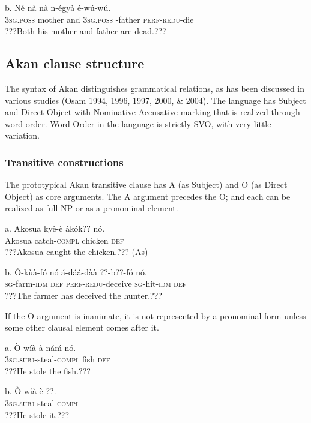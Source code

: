 \documentclass[output=paper]{langsci/langscibook}
\begin{document}
\ea
\gll  b.  Né    nà    nà  n-égyà      é-wú-wú.\\
       \textsc{3sg.poss}  mother    and  \textsc{3sg.poss} -father  \textsc{perf-redu}{}-die\\
\glt   ???Both his mother and father are dead.??? \citep[24]{Martin1936}
\z

\subsection{Akan clause structure}

The syntax of Akan distinguishes grammatical relations, as has been discussed in various studies (Osam 1994, 1996, 1997, 2000, \& 2004). The language has Subject and Direct Object with Nominative Accusative marking that is realized through word order. Word Order in the language is strictly SVO, with very little variation.

\subsubsection{Transitive constructions}

The prototypical Akan transitive clause has A (as Subject) and O (as Direct Object) as core arguments. The A argument precedes the O; and each can be realized as full NP or as a pronominal element.


\ea
\gll a.  Akosua    kyè-è    àkók??    nó.\\
       Akosua  catch-\textsc{compl}  chicken  \textsc{def}\\
\glt   ???Akosua caught the chicken.??? (As)
\z

\ea
\gll  b.  \`{O}-k\`{u}à-fó    nó  á-dáá-dàà    ??{}-b??-fó    nó.\\
       \textsc{sg}{}-farm-\textsc{idm}    \textsc{def}  \textsc{perf-redu}{}-deceive  \textsc{sg}{}-hit-\textsc{idm}  \textsc{def}\\
\glt   ???The farmer has deceived the hunter.???
\z

If the O argument is inanimate, it is not represented by a pronominal form unless some other clausal element comes after it.

\ea
\gll a.  \`{O}-wíà-à    náḿ  nó.\\
       \textsc{3sg.subj}{}-steal-\textsc{compl}  fish  \textsc{def}\\
\glt   ???He stole the fish.???
\z

\ea
\gll  b.  \`{O}-wíà-è      ??.\\
       \textsc{3sg.subj}{}-steal-\textsc{compl}\\
\glt   ???He stole it.???
\z
\end{document}
